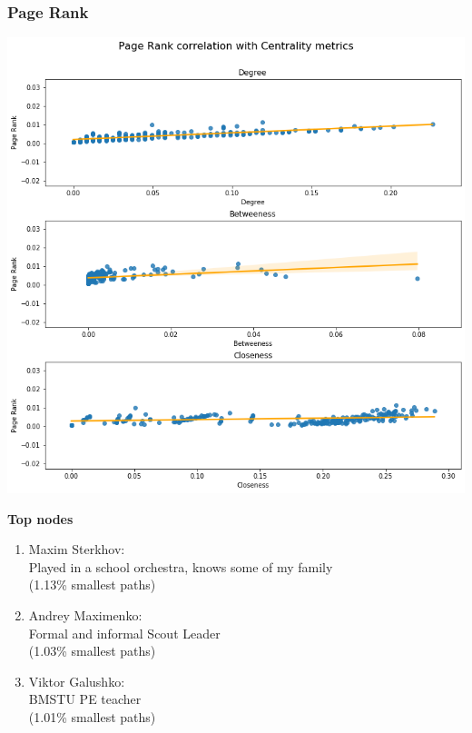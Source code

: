 \documentclass{beamer}
\begin{document}
\begin{frame}
\frametitle{Page Rank}
\begin{multicols}{2}
	\includegraphics[width=\columnwidth]{page_rank_correlations.png}
	\columnbreak
	
	\textbf{Top nodes}
	\begin{enumerate}
	\item Maxim Sterkhov:\\Played in a school orchestra, knows some of my family\\(1.13\% smallest paths)
	\item Andrey Maximenko:\\Formal and informal Scout Leader\\(1.03\% smallest paths)
	\item Viktor Galushko:\\BMSTU PE teacher\\(1.01\% smallest paths)
	\end{enumerate}
\end{multicols}

\end{frame}
\end{document}

